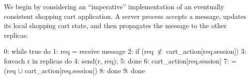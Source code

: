 
We begin by considering an ``imperative'' 
implementation of an eventually consistent shopping cart application.  A
server process accepts a message, updates its local shopping cart
state, and then propagates the message to the other replicas:






\begin{Dedalus}
0: while true do
1:  req = receive message
2:  if (req \(\notin\) cart_action[req.session])
3:    foreach r in replicas do
4:      send(r, req);
5:    done
6:    cart_action[req.session]
7:      = (req \(\cup\) cart_action[req.session]) 
8:  done
9: done
\end{Dedalus}

